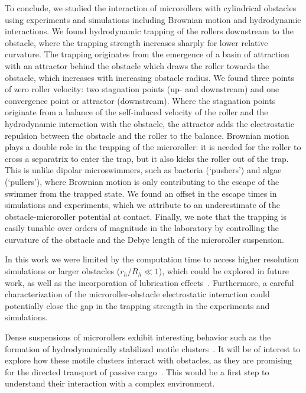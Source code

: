 \documentclass[12pt]{article}
\begin{document}
To conclude, we studied the interaction of microrollers with cylindrical obstacles using experiments and simulations including Brownian motion and hydrodynamic interactions. We found hydrodynamic trapping of the rollers downstream to the obstacle, where the trapping strength increases sharply for lower relative curvature. The trapping originates from the emergence of a basin of attraction with an attractor behind the obstacle which draws the roller towards the obstacle, which increases with increasing obstacle radius. We found three points of zero roller velocity: two stagnation points (up- and downstream) and one convergence point or attractor (downstream). Where the stagnation points originate from a balance of the self-induced velocity of the roller and the hydrodynamic interaction with the obstacle, the attractor adds the electrostatic repulsion between the obstacle and the roller to the balance. Brownian motion plays a double role in the trapping of the microroller: it is needed for the roller to cross a separatrix to enter the trap, but it also kicks the roller out of the trap. This is unlike dipolar microswimmers, such as bacteria (`pushers') and algae (`pullers'), where Brownian motion is only contributing to the escape of the swimmer from the trapped state.
We found an offset in the escape times in simulations and experiments, which we attribute to an underestimate of the obstacle-microroller potential at contact.
Finally, we note that the trapping is easily tunable over orders of magnitude in the laboratory by controlling the curvature of the obstacle and the Debye length of the microroller suspension.

In this work we were limited by the computation time to access higher resolution simulations or larger obstacles ($r_h/R_h \ll 1$), which could be explored in future work, as well as the incorporation of lubrication effects~\cite{sprinkle2020active}. Furthermore, a careful characterization of the microroller-obstacle electrostatic interaction could potentially close the gap in the trapping strength in the experiments and simulations.

Dense suspensions of microrollers exhibit interesting behavior such as %
the formation of hydrodynamically stabilized motile clusters~\cite{driscoll2017unstable}. It will be of interest to explore how these motile clusters interact with obstacles, as they are promising for the directed transport of passive cargo~\cite{driscoll2017unstable}. This would be a first step to understand their interaction with a complex environment. 
\end{document}
